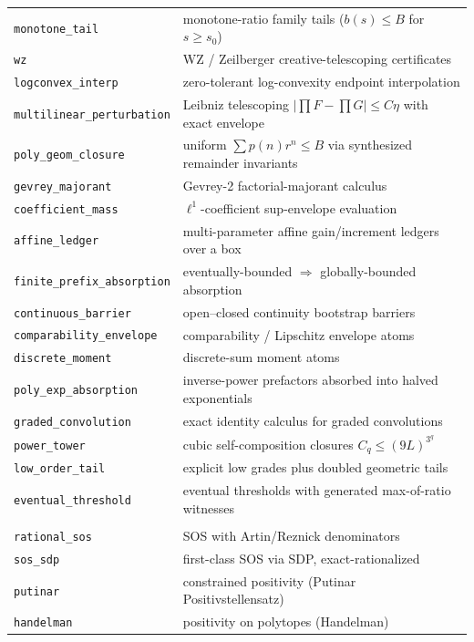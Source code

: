 {\begin{longtable}{@{}p{}p{}@{}}
\texttt{monotone\_tail} & monotone-ratio family tails ($b(s) \le B$ for $s \ge s_0$) \\
\texttt{wz} & WZ / Zeilberger creative-telescoping certificates \\
\texttt{logconvex\_interp} & zero-tolerant log-convexity endpoint interpolation \\
\texttt{multilinear\_perturbation} & Leibniz telescoping $|\prod F - \prod G| \le C\eta$ with exact envelope \\
\texttt{poly\_geom\_closure} & uniform $\sum p(n) r^n \le B$ via synthesized remainder invariants \\
\texttt{gevrey\_majorant} & Gevrey-2 factorial-majorant calculus \\
\texttt{coefficient\_mass} & $\ell^1$-coefficient sup-envelope evaluation \\
\texttt{affine\_ledger} & multi-parameter affine gain/increment ledgers over a box \\
\texttt{finite\_prefix\_absorption} & eventually-bounded $\Rightarrow$ globally-bounded absorption \\
\texttt{continuous\_barrier} & open--closed continuity bootstrap barriers \\
\texttt{comparability\_envelope} & comparability / Lipschitz envelope atoms \\
\texttt{discrete\_moment} & discrete-sum moment atoms \\
\texttt{poly\_exp\_absorption} & inverse-power prefactors absorbed into halved exponentials \\
\texttt{graded\_convolution} & exact identity calculus for graded convolutions \\
\texttt{power\_tower} & cubic self-composition closures $C_q \le (9L)^{3^q}$ \\
\texttt{low\_order\_tail} & explicit low grades plus doubled geometric tails \\
\texttt{eventual\_threshold} & eventual thresholds with generated max-of-ratio witnesses \\
\addlinespace
\multicolumn{2}{@{}l}{\emph{Semialgebraic positivity}} \\
\texttt{rational\_sos} & SOS with Artin/Reznick denominators \\
\texttt{sos\_sdp} & first-class SOS via SDP, exact-rationalized \\
\texttt{putinar} & constrained positivity (Putinar Positivstellensatz) \\
\texttt{handelman} & positivity on polytopes (Handelman) \\

\end{longtable}}
